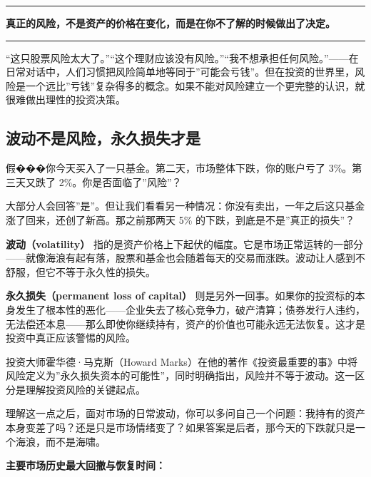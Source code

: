 \documentclass[a4paper,11pt,oneside,fontset=none,UTF8,zihao=-4]{ctexbook}
\begin{document}
\begin{center}{\color{dh-bronze}\rule{0.2\textwidth}{0.5pt}}\end{center}

\begin{dhquote}
\textbf{真正的风险，不是资产的价格在变化，而是在你不了解的时候做出了决定。}
\end{dhquote}

\begin{center}{\color{dh-bronze}\rule{0.2\textwidth}{0.5pt}}\end{center}

``这只股票风险太大了。''``这个理财应该没有风险。''``我不想承担任何风险。''------在日常对话中，人们习惯把风险简单地等同于''可能会亏钱''。但在投资的世界里，风险是一个远比''亏钱''复杂得多的概念。如果不能对风险建立一个更完整的认识，就很难做出理性的投资决策。

\subsection{波动不是风险，永久损失才是}\label{ux6ce2ux52a8ux4e0dux662fux98ceux9669ux6c38ux4e45ux635fux5931ux624dux662f}

假���你今天买入了一只基金。第二天，市场整体下跌，你的账户亏了
3\%。第三天又跌了 2\%。你是否面临了''风险''？

大部分人会回答''是''。但让我们看看另一种情况：你没有卖出，一年之后这只基金涨了回来，还创了新高。那之前那两天
5\% 的下跌，到底是不是''真正的损失''？

\textbf{波动（volatility）}
指的是资产价格上下起伏的幅度。它是市场正常运转的一部分------就像海浪有起有落，股票和基金也会随着每天的交易而涨跌。波动让人感到不舒服，但它不等于永久性的损失。

\textbf{永久损失（permanent loss of capital）}
则是另外一回事。如果你的投资标的本身发生了根本性的恶化------企业失去了核心竞争力，破产清算；债券发行人违约，无法偿还本息------那么即使你继续持有，资产的价值也可能永远无法恢复。这才是投资中真正应该警惕的风险。

投资大师霍华德·马克斯（Howard
Marks）在他的著作《投资最重要的事》中将风险定义为''永久损失资本的可能性''，同时明确指出，风险并不等于波动。这一区分是理解投资风险的关键起点。

理解这一点之后，面对市场的日常波动，你可以多问自己一个问题：我持有的资产本身变差了吗？还是只是市场情绪变了？如果答案是后者，那今天的下跌就只是一个海浪，而不是海啸。

\textbf{主要市场历史最大回撤与恢复时间：}
\end{document}
